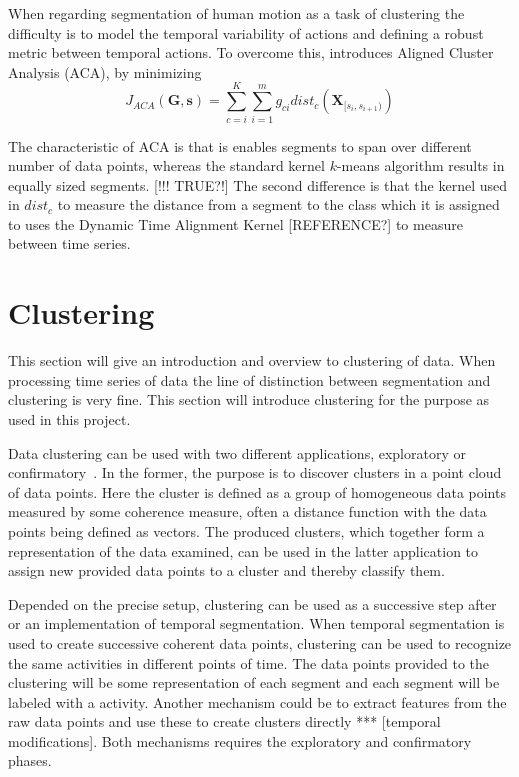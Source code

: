 When regarding segmentation of human motion as a task of clustering the difficulty is to model the temporal variability of actions and defining a robust metric between temporal actions.
To overcome this, \cite{zhou2008aligned} introduces Aligned Cluster Analysis (ACA), by minimizing
\begin{equation}
	\label{eq:ACA}
	J_{\mathit{ACA}}(\mathbf{G},\mathbf{s}) = \sum_{c=i}^{K} \sum_{i=1}^{m} g_{ci} \mathit{dist}_c (\mathbf{X}_{[s_i,s_{i+1})})
\end{equation}

The characteristic of ACA is that is enables segments to span over different number of data points, whereas the standard kernel $k$-means algorithm results in equally sized segments.
[!!! TRUE?!] The second difference is that the kernel used in $\mathit{dist}_c$ to measure the distance from a segment to the class which it is assigned to uses the Dynamic Time Alignment Kernel [REFERENCE?] to measure between time series.


\section{Clustering}

This section will give an introduction and overview to clustering of data.
When processing time series of data the line of distinction between segmentation and clustering is very fine.
This section will introduce clustering for the purpose as used in this project.

Data clustering can be used with two different applications, exploratory or confirmatory~\cite{jain1999data}.
In the former, the purpose is to discover clusters in a point cloud of data points.
Here the cluster is defined as a group of homogeneous data points measured by some coherence measure, often a distance function with the data points being defined as vectors.
The produced clusters, which together form a representation of the data examined, can be used in the latter application to assign new provided data points to a cluster and thereby classify them.

Depended on the precise setup, clustering can be used as a successive step after or an implementation of temporal segmentation.
When temporal segmentation is used to create successive coherent data points, clustering can be used to recognize the same activities in different points of time.
The data points provided to the clustering will be some representation of each segment and each segment will be labeled with a activity.
Another mechanism could be to extract features from the raw data points and use these to create clusters directly *** [temporal modifications].
Both mechanisms requires the exploratory and confirmatory phases.

